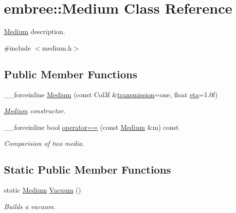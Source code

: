 \hypertarget{classembree_1_1_medium}{
\section{embree::Medium Class Reference}
\label{classembree_1_1_medium}
}


\hyperlink{classembree_1_1_medium}{Medium} description.  




{\ttfamily \#include $<$medium.h$>$}

\subsection*{Public Member Functions}
\begin{DoxyCompactItemize}
\item 
\_\-\_\-forceinline \hyperlink{classembree_1_1_medium_ac834ea19fdceff8a6b8ae41aa043c08d}{Medium} (const Col3f \&\hyperlink{classembree_1_1_medium_a4adaa3f000afbe7bf57fb61764dbcb87}{transmission}=one, float \hyperlink{classembree_1_1_medium_a99756af7cc156fb28ecd2c733872774f}{eta}=1.0f)
\begin{DoxyCompactList}\small\item\em \hyperlink{classembree_1_1_medium}{Medium} constructor. \item\end{DoxyCompactList}\item 
\_\-\_\-forceinline bool \hyperlink{classembree_1_1_medium_a9c2a24d0796dd9dd7bd97f9f2e4d2cfe}{operator==} (const \hyperlink{classembree_1_1_medium}{Medium} \&m) const 
\begin{DoxyCompactList}\small\item\em Comparision of two media. \item\end{DoxyCompactList}\end{DoxyCompactItemize}
\subsection*{Static Public Member Functions}
\begin{DoxyCompactItemize}
\item 
static \hyperlink{classembree_1_1_medium}{Medium} \hyperlink{classembree_1_1_medium_a2b2d256d68fe5b3d8a69a96232613504}{Vacuum} ()
\begin{DoxyCompactList}\small\item\em Builds a vacuum. \item\end{DoxyCompactList}\end{DoxyCompactItemize}
